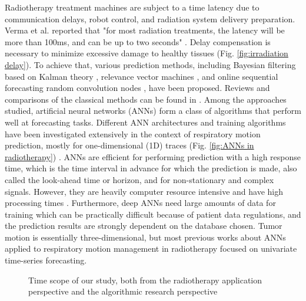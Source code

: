 \documentclass[twocolumn,a4paper]{svjour3} \sloppy          \smartqed
\begin{document}
Radiotherapy treatment machines are subject to a time latency due to communication delays, robot control, and radiation system delivery preparation. Verma et al. reported that "for most radiation treatments, the latency will be more than 100ms, and can be up to two seconds" \cite{verma2010survey}. Delay compensation is necessary to minimize excessive damage to healthy tissues (Fig. \ref{fig:irradiation delay}). To achieve that, various prediction methods,  including Bayesian filtering based on Kalman theory \cite{remy2021potential}, relevance vector machines \cite{fan2020respiratory}, and online sequential forecasting random convolution nodes \cite{wang2020fast}, have been proposed. Reviews and comparisons of the classical methods can be found in \cite{verma2010survey, lee2014prediction, johl2020performance, ehrhardt20134d}. Among the approaches studied, artificial neural networks (ANNs) form a class of algorithms that perform well at forecasting tasks. Different ANN architectures and training algorithms have been investigated extensively in the context of respiratory motion prediction, mostly for one-dimensional (1D) traces (Fig. \ref{fig:ANNs in radiotherapy}) \cite{sharp2004prediction, goodband2008comparison, murphy2009optimization, krauss2011comparative, lee2011respiratory, lee2013customized, choi2014performance, sun2017respiratory, kai2018prediction, teo2018feasibility, wang2018feasibility, jiang2019prediction, lin2019towards, yun2019deep, johl2020performance, mafi2020real, yu2020rapid, chang2021real, lee2021geometric, POHL2021101941, wang2021real}. ANNs are efficient for performing prediction with a high response time, which is the time interval in advance for which the prediction is made, also called the look-ahead time or horizon, and for non-stationary and complex signals. However, they are heavily computer resource intensive and have high processing times \cite{verma2010survey}. Furthermore, deep ANNs need large amounts of data for training which can be practically difficult because of patient data regulations, and the prediction results are strongly dependent on the database chosen. Tumor motion is essentially three-dimensional, but most previous works about ANNs applied to respiratory motion management in radiotherapy focused on univariate time-series forecasting.

\begin{figure*}[htb!]
    \centering
    \quad
    \caption{Time scope of our study, both from the radiotherapy application perspective and the algorithmic research perspective}\end{figure*}
\end{document}
